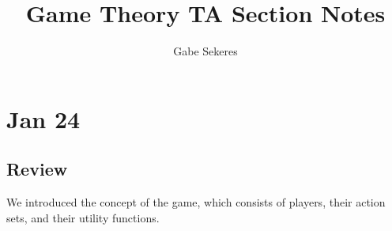 \documentclass[10pt]{article}
\title{Game Theory TA Section Notes}
\author{Gabe Sekeres}
\begin{document}
\maketitle

\tableofcontents
\newpage

\section{Jan 24}

\subsection{Review}

We introduced the concept of the game, which consists of players, their action sets, and their utility functions.
\end{document}
